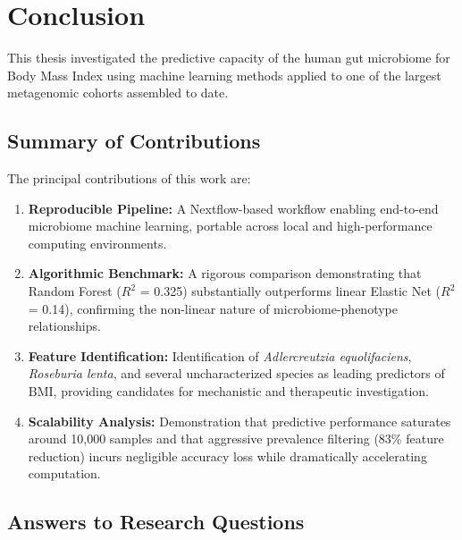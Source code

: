 
\chapter{Conclusion}
\label{ch:conclusion}

This thesis investigated the predictive capacity of the human gut microbiome for Body Mass Index using machine learning methods applied to one of the largest metagenomic cohorts assembled to date.

\section{Summary of Contributions}

The principal contributions of this work are:

\begin{enumerate}
    \item \textbf{Reproducible Pipeline:} A Nextflow-based workflow enabling end-to-end microbiome machine learning, portable across local and high-performance computing environments.
    
    \item \textbf{Algorithmic Benchmark:} A rigorous comparison demonstrating that Random Forest ($R^2$ = 0.325) substantially outperforms linear Elastic Net ($R^2$ = 0.14), confirming the non-linear nature of microbiome-phenotype relationships.
    
    \item \textbf{Feature Identification:} Identification of \emph{Adlercreutzia equolifaciens}, \emph{Roseburia lenta}, and several uncharacterized species as leading predictors of BMI, providing candidates for mechanistic and therapeutic investigation.
    
    \item \textbf{Scalability Analysis:} Demonstration that predictive performance saturates around 10,000 samples and that aggressive prevalence filtering (83\% feature reduction) incurs negligible accuracy loss while dramatically accelerating computation.
\end{enumerate}

\section{Answers to Research Questions}

